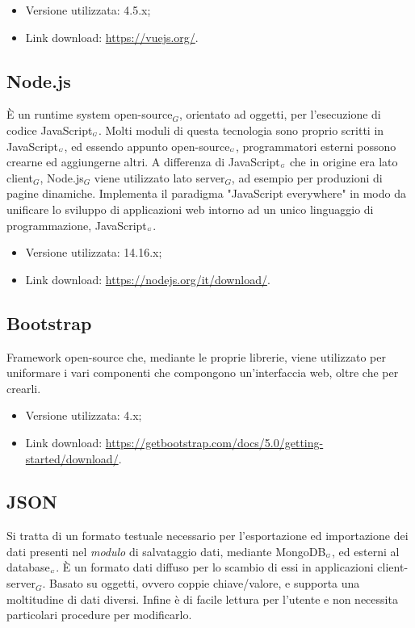 \begin{itemize}
  \item Versione utilizzata: 4.5.x;
  \item Link download: \url{https://vuejs.org/}.
\end{itemize}

\subsection{Node.js}\label{TecnologieNode}
È un runtime system open-source$_G$, orientato ad oggetti, per l'esecuzione di codice JavaScript$_{\scaleto{G}{3pt}}$.
Molti moduli di questa tecnologia sono proprio scritti in JavaScript$_{\scaleto{G}{3pt}}$, ed essendo appunto open-source$_{\scaleto{G}{3pt}}$, programmatori esterni possono crearne ed aggiungerne altri.
A differenza di JavaScript$_{\scaleto{G}{3pt}}$ che in origine era lato client$_G$, Node.js$_G$ viene utilizzato lato server$_G$, ad esempio per produzioni di pagine dinamiche.
Implementa il paradigma "JavaScript everywhere" in modo da unificare lo sviluppo di applicazioni web intorno ad un unico linguaggio di programmazione, JavaScript$_{\scaleto{G}{3pt}}$.

\begin{itemize}
  \item Versione utilizzata: 14.16.x;
  \item Link download: \url{https://nodejs.org/it/download/}.
\end{itemize}

\subsection{Bootstrap}\label{TecnologieBootstrap}
Framework open-source che, mediante le proprie librerie, viene utilizzato per uniformare i vari componenti che compongono un'interfaccia web, oltre che per crearli.

\begin{itemize}
  \item Versione utilizzata: 4.x;
  \item Link download: \url{https://getbootstrap.com/docs/5.0/getting-started/download/}.
\end{itemize}



\subsection{JSON}\label{TecnologieJson}
Si tratta di un formato testuale necessario per l'esportazione ed importazione dei dati presenti nel \textit{modulo} di salvataggio dati, mediante MongoDB$_{\scaleto{G}{3pt}}$, ed esterni al database$_{\scaleto{G}{3pt}}$.
È un formato dati diffuso per lo scambio di essi in applicazioni client-server$_G$.
Basato su oggetti, ovvero coppie chiave/valore, e supporta una moltitudine di dati diversi. Infine è di facile lettura per l'utente e non necessita particolari procedure per modificarlo.
